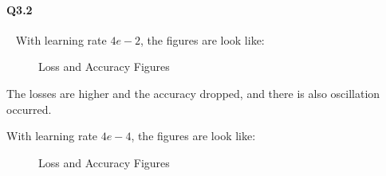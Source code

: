 \documentclass[11pt]{article} \usepackage{fullpage} \usepackage{graphicx} \usepackage{epstopdf} \usepackage{color} \usepackage{psfrag} \usepackage{pdfsync}\usepackage{indentfirst}\usepackage{subfigure}\usepackage{float}\usepackage[section]{placeins}
\begin{document}
\paragraph{Q3.2}~{}
With learning rate $4e-2$, the figures are look like:
\begin{figure}[H]
\centering
{}
\caption{Loss and Accuracy Figures}
\end{figure}

The losses are higher and the accuracy dropped, and there is also oscillation occurred.

With learning rate $4e-4$, the figures are look like:
\begin{figure}[H]
\centering
{}
\caption{Loss and Accuracy Figures}
\end{figure}
\end{document}
